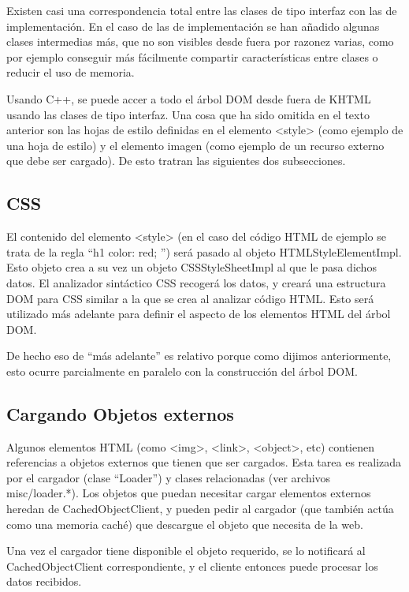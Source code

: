 Existen casi una correspondencia total entre las clases de tipo interfaz con las de implementación. En el caso de las de implementación se han añadido algunas clases intermedias más, que no son visibles desde fuera por razonez varias, como por ejemplo conseguir más fácilmente compartir características entre clases o reducir el uso de memoria.

Usando C++, se puede accer a todo el árbol DOM desde fuera de KHTML usando las clases de tipo interfaz. Una cosa que ha sido omitida en el texto anterior son las hojas de estilo definidas en el elemento <style> (como ejemplo de una hoja de estilo) y el elemento imagen (como ejemplo de un recurso externo que debe ser cargado). De esto tratran las siguientes dos subsecciones.


\subsection{CSS}\label{khtml_css}

El contenido del elemento <style> (en el caso del código HTML de ejemplo se trata de la regla ``h1 { color: red; }'') será pasado al objeto HTMLStyleElementImpl. Esto objeto crea a su vez un objeto CSSStyleSheetImpl al que le pasa dichos datos. El analizador sintáctico CSS recogerá los datos, y creará una estructura DOM para CSS similar a la que se crea al analizar código HTML. Esto será utilizado más adelante para definir el aspecto de los elementos HTML del árbol DOM.

De hecho eso de ``más adelante'' es relativo porque como dijimos anteriormente, esto ocurre parcialmente en paralelo con la construcción del árbol DOM.

\subsection{Cargando Objetos externos}\label{khtml_external_objs}

Algunos elementos HTML (como <img>, <link>, <object>, etc) contienen referencias a objetos externos que tienen que ser cargados. Esta tarea es realizada por el cargador (clase ``Loader'') y clases relacionadas (ver archivos misc/loader.*). Los objetos que puedan necesitar cargar elementos externos heredan de CachedObjectClient, y pueden pedir al cargador (que también actúa como una memoria caché) que descargue el objeto que necesita de la web.

Una vez el cargador tiene disponible el objeto requerido, se lo notificará al CachedObjectClient correspondiente, y el cliente entonces puede procesar los datos recibidos.

